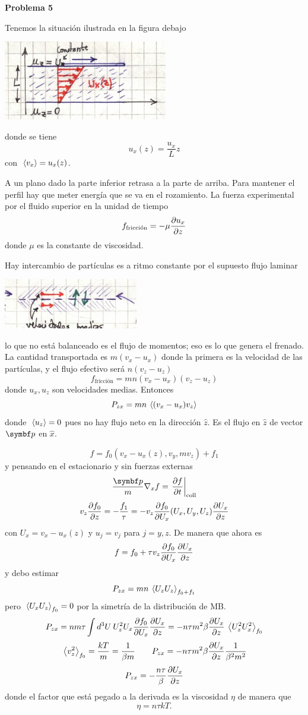 \documentclass[10pt,oneside]{CBFT_book}
\begin{document}
\begin{ejemplo}{\bf Problema 5}

Tenemos la situación ilustrada en la figura debajo

\includegraphics[scale=0.5]{images/1606329328.jpg}

donde se tiene
\[
	u_x(z) = \frac{u_x}{L} z
\]
con $\:\left\langle v_x \right\rangle = u_x(z)$.

A un plano dado la parte inferior retrasa a la parte de arriba. Para mantener el perfil hay que meter
energía que se va en el rozamiento.
La fuerza experimental por el fluido superior en la unidad de tiempo
\[
	f_\text{fricción} = - \mu \frac{\partial^{\hspace{-0.05em}} {u_x}}{\partial {z}^{\hspace{-0.05em}}}
\]
donde $\mu$ es la constante de viscosidad.

Hay intercambio de partículas es a ritmo constante por el supuesto flujo laminar

\includegraphics[scale=0.5]{images/1606329331.jpg}

lo que no está balanceado es el flujo de momentos; eso es lo que genera el frenado.
La cantidad transportada es $ m (v_x - u_x)$ donde la primera es la velocidad de las partículas, y
el flujo efectivo será $n (v_z - u_z )$
\[
	f_\text{fricción} = m n ( v_x - u_x ) (v_z - u_z )
\]
donde $u_x, u_z$ son velocidades medias. Entonces
\[
	P_{zx} = m n \:\left\langle  (v_x - u_x) v_z  \right\rangle
\]
donde $\:\left\langle u_z \right\rangle=0$ pues no hay flujo neto en la dirección $\hat{z}$. Es el flujo en $\hat{z}$ de vector
$\vbp$ en $\hat{x}$.

\[
	f = f_0 ( v_x - u_x(z), v_y,m v_z ) + f_1
\]
y pensando en el estacionario y sin fuerzas externas
\[
	\frac{\vbp}{m} \nabla_x f = \dpare{f}{t}{\text{coll}}
\]
\[
	v_z \frac{\partial^{\hspace{-0.05em}} {f_0}}{\partial {z}^{\hspace{-0.05em}}} = - \frac{f_1}{\tau} = - v_z \frac{\partial^{\hspace{-0.05em}} {f_0}}{\partial {U_x}^{\hspace{-0.05em}}}(U_x,U_y,U_z) \frac{\partial^{\hspace{-0.05em}} {U_x}}{\partial {z}^{\hspace{-0.05em}}}
\]
con $U_x = v_x - u_x(z)$ y $u_j=v_j$ para $j=y,z$.
De manera que ahora es
\[
	f = f_0 + \tau v_z \frac{\partial^{\hspace{-0.05em}} {f_0}}{\partial {U_x}^{\hspace{-0.05em}}} \frac{\partial^{\hspace{-0.05em}} {U_x}}{\partial {z}^{\hspace{-0.05em}}}
\]
y debo estimar
\[
	P_{zx} = m n \:\left\langle U_zU_z \right\rangle_{f_0+f_1}
\]
pero $\:\left\langle U_xU_z \right\rangle_{f_0} = 0$ por la simetría de la distribución de MB.
\[
	P_{zx} = n m \tau \int d^3 U \: U^2_z U_x \frac{\partial^{\hspace{-0.05em}} {f_0}}{\partial {U_x}^{\hspace{-0.05em}}} \frac{\partial^{\hspace{-0.05em}} {U_x}}{\partial {z}^{\hspace{-0.05em}}} =
	- n \tau m^2 \beta \frac{\partial^{\hspace{-0.05em}} {U_x}}{\partial {z}^{\hspace{-0.05em}}} \:\left\langle  U_z^2 U^2_x \right\rangle_{f_0}
\]
\[
	\:\left\langle  v_z^2  \right\rangle_{f_0} = \frac{ k T }{m} = \frac{1}{\beta m} \qquad 
	P_{zx} = - n \tau m^2 \beta \frac{\partial^{\hspace{-0.05em}} {U_x}}{\partial {z}^{\hspace{-0.05em}}} \frac{1}{\beta^2 m^2 }
\]
\[
	P_{zx} = - \frac{n \tau}{\beta} \frac{\partial^{\hspace{-0.05em}} {U_x}}{\partial {z}^{\hspace{-0.05em}}}
\]
donde el factor que está pegado a la derivada es la viscosidad $\eta$ de manera que
\[
	\eta = n \tau k T.
\]


\end{ejemplo}
\end{document}
